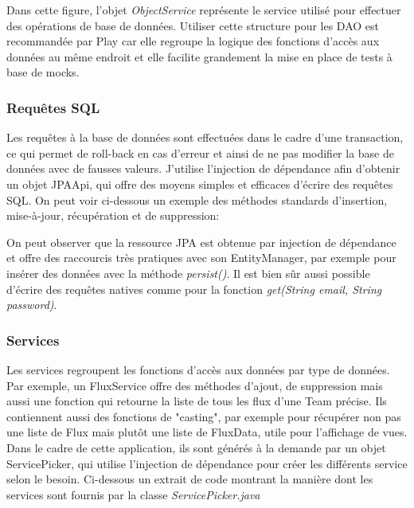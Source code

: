 \documentclass[french]{article}
\begin{document}
Dans cette figure, l'objet \textit{ObjectService} représente le service utilisé pour effectuer des opérations de base de données. Utiliser cette structure pour les DAO est recommandée par Play car elle regroupe la logique des fonctions d'accès aux données au même endroit et elle facilite grandement la mise en place de tests à base de mocks. 

\subsubsection{Requêtes SQL}

Les requêtes à la base de données sont effectuées dans le cadre d'une transaction, ce qui permet de roll-back en cas d'erreur et ainsi de ne pas modifier la base de données avec de fausses valeurs. J'utilise l'injection de dépendance afin d'obtenir un objet JPAApi, qui offre des moyens simples et efficaces d'écrire des requêtes SQL. On peut voir ci-dessous un exemple des méthodes standards d'insertion, mise-à-jour, récupération et de suppression:



On peut observer que la ressource JPA est obtenue par injection de dépendance et offre des raccourcis très pratiques avec son EntityManager, par exemple pour insérer des données avec la méthode \textit{persist()}. Il est bien sûr aussi possible d'écrire des requêtes natives comme pour la fonction \textit{get(String email, String password)}.

\subsubsection{Services}

Les services regroupent les fonctions d'accès aux données par type de données. Par exemple, un FluxService offre des méthodes d'ajout, de suppression mais aussi une fonction qui retourne la liste de tous les flux d'une Team précise. Ils contiennent aussi des fonctions de "casting", par exemple pour récupérer non pas une liste de Flux mais plutôt une liste de FluxData, utile pour l'affichage de vues.\newline
Dans le cadre de cette application, ils sont générés à la demande par un objet ServicePicker, qui utilise l'injection de dépendance pour créer les différents service selon le besoin. Ci-dessous un extrait de code montrant la manière dont les services sont fournis par la classe \textit{ServicePicker.java}
\end{document}
